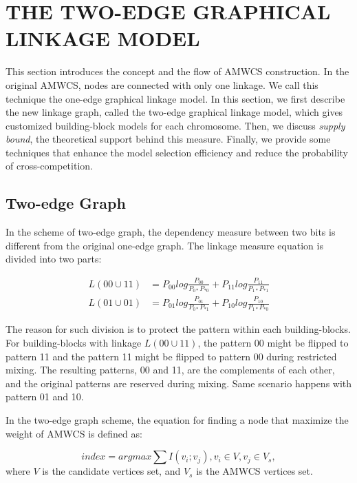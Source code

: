 \documentclass{sig-alternate-05-2015}
\begin{document}
\section{THE TWO-EDGE GRAPHICAL LINKAGE MODEL}
This section introduces the concept and the flow of AMWCS construction. In the original AMWCS, nodes are connected with only one linkage. We call this technique the one-edge graphical linkage model. In this section, we first describe the new linkage graph, called the two-edge graphical linkage model, which gives customized building-block models for each chromosome. Then, we discuss \textit{supply bound}, the theoretical support behind this measure. Finally, we provide some techniques that enhance the model selection efficiency and reduce the probability of cross-competition. 

\subsection{Two-edge Graph}
In the scheme of two-edge graph, the dependency measure between two bits is different from the original one-edge graph. The linkage measure equation is divided into two parts:

\begin{equation} 
\begin{split}
L( 00 \cup 11 ) &= P_{00 }log\frac{P_{00}}{P_{0*} P_{*0}} + P_{11 }log\frac{P_{11}}{P_{1*} P_{*1}}  \\
L( 01 \cup 01 ) &= P_{01 }log\frac{P_{01}}{P_{0*} P_{*1}} + P_{10 }log\frac{P_{10}}{P_{1*} P_{*0}}  
\end{split}
\end{equation}

The reason for such division is to protect the pattern within each building-blocks. For building-blocks with linkage  $L(00\cup11)$, the pattern 00 might be flipped to pattern 11 and the pattern 11 might be flipped to pattern 00 during restricted mixing. The resulting patterns, 00 and 11, are the complements of each other, and the original patterns are reserved during mixing. Same scenario happens with pattern 01 and 10.


In the two-edge graph scheme, the equation for finding a node that maximize the weight of AMWCS is defined as:

\begin{equation} \textit{index} = argmax\sum I(v_i;v_j), {v_i\in V}, {v_j \in V_s},\end{equation}
where $V$ is the candidate vertices set, and $V_s$ is the AMWCS vertices set.
\end{document}
